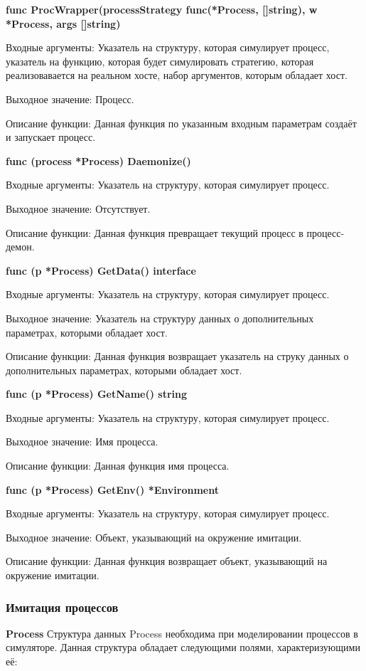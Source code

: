 \textbf{func ProcWrapper(processStrategy func(*Process, []string), w *Process, args []string)}

Входные аргументы: Указатель на структуру, которая симулирует процесс, указатель на функцию, которая будет симулировать стратегию, которая реализовавается на реальном хосте, набор аргументов, которым обладает хост.

Выходное значение: Процесс.

Описание функции: Данная функция по указанным входным параметрам создаёт и запускает процесс.


\textbf{func (process *Process) Daemonize() }

Входные аргументы: Указатель на структуру, которая симулирует процесс.

Выходное значение: Отсутствует.

Описание функции: Данная функция превращает текущий процесс в процесс-демон.


\textbf{func (p *Process) GetData() interface}

Входные аргументы: Указатель на структуру, которая симулирует процесс.

Выходное значение: Указатель на структуру данных о дополнительных параметрах, которыми обладает хост.

Описание функции: Данная функция возвращает указатель на струку данных о дополнительных параметрах, которыми обладает хост.


\textbf{func (p *Process) GetName() string}

Входные аргументы: Указатель на структуру, которая симулирует процесс.

Выходное значение: Имя процесса.

Описание функции: Данная функция имя процесса.

\textbf{func (p *Process) GetEnv() *Environment}

Входные аргументы: Указатель на структуру, которая симулирует процесс.

Выходное значение: Объект, указывающий на окружение имитации.

Описание функции: Данная функция возвращает объект, указывающий на окружение имитации.

\subsubsection{Имитация процессов}
\textbf{Process}
Структура данных Process необходима при моделировании процессов в симуляторе. Данная структура обладает следующими полями, характеризующими  её:

